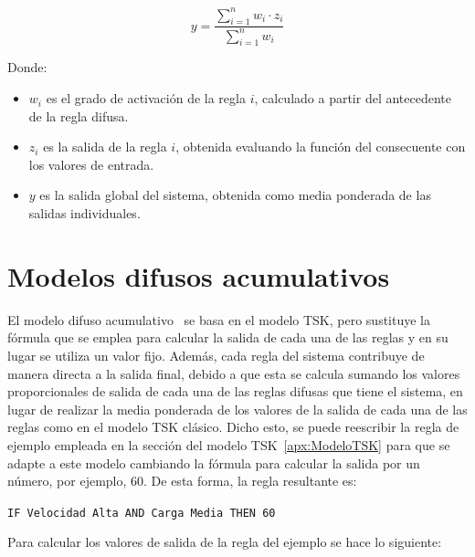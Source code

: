 \begin{equation}
y = \frac{\sum_{i=1}^{n} w_i \cdot z_i}{\sum_{i=1}^{n} w_i}
\end{equation}

Donde:
\begin{itemize}
  \item $w_i$ es el grado de activación de la regla $i$, calculado a partir del antecedente de la regla difusa.
  \item $z_i$ es la salida de la regla $i$, obtenida evaluando la función del consecuente con los valores de entrada.
  \item $y$ es la salida global del sistema, obtenida como media ponderada de las salidas individuales.
\end{itemize}
\newpage
\section{Modelos difusos acumulativos}
\label{apx:ModelosDifusosAcumulativos}

El modelo difuso acumulativo~\cite{MUNOZVALERO2025113415} se basa en el modelo TSK, pero sustituye la fórmula que se emplea para calcular la salida de cada una de las reglas y en su lugar se utiliza un valor fijo. Además, cada regla del sistema contribuye de manera directa a la salida final, debido a que esta se calcula sumando los valores proporcionales de salida de cada una de las reglas difusas que tiene el sistema, en lugar de realizar la media ponderada de los valores de la salida de cada una de las reglas como en el modelo TSK clásico. Dicho esto, se puede reescribir la regla de ejemplo empleada en la sección del modelo TSK~\ref{apx:ModeloTSK} para que se adapte a este modelo cambiando la fórmula para calcular la salida por un número, por ejemplo, 60. De esta forma, la regla resultante es:

\begin{center}
   \texttt{IF Velocidad Alta AND Carga Media THEN 60} 
\end{center}

\noindent Para calcular los valores de salida de la regla del ejemplo se hace lo siguiente:

